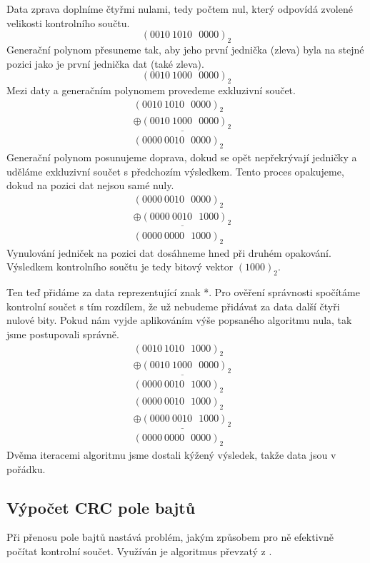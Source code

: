 Data zprava doplníme čtyřmi nulami, tedy počtem nul, který odpovídá zvolené velikosti kontrolního součtu.
$$ (0010~1010~~~0000)_2 $$
Generační polynom přesuneme tak, aby jeho první jednička (zleva) byla na stejné pozici jako je první jednička dat (také zleva).
$$ (0010~1000~~~0000)_2 $$
Mezi daty a generačním polynomem provedeme exkluzivní součet.
\begin{eqnarray}
    (0010~1010~~~0000)_2  & \nonumber\\\underline{\oplus
    (0010~1000~~~0000)_2} & \nonumber\\
    (0000~0010~~~0000)_2  & \nonumber
\end{eqnarray}
Generační polynom posunujeme doprava, dokud se opět nepřekrývají jedničky a uděláme exkluzivní součet s předchozím výsledkem. Tento proces opakujeme, dokud na pozici dat nejsou samé nuly.
\begin{eqnarray}
    (0000~0010~~~0000)_2  & \nonumber\\\underline{\oplus
    (0000~0010~~~1000)_2} & \nonumber\\
    (0000~0000~~~1000)_2  & \nonumber
\end{eqnarray}
Vynulování jedniček na pozici dat dosáhneme hned při druhém opakování. Výsledkem kontrolního součtu je tedy bitový vektor $(1000)_2$.

Ten teď přidáme za data reprezentující znak *. Pro ověření správnosti spočítáme kontrolní součet s tím rozdílem, že už nebudeme přidávat za data další čtyři nulové bity. Pokud nám vyjde aplikováním výše popsaného algoritmu nula, tak jsme postupovali správně.
\begin{eqnarray}
    (0010~1010~~~1000)_2  & \nonumber\\\underline{\oplus
    (0010~1000~~~0000)_2} & \nonumber\\
    (0000~0010~~~1000)_2  & \nonumber
\end{eqnarray}
\begin{eqnarray}
    (0000~0010~~~1000)_2  & \nonumber\\\underline{\oplus
    (0000~0010~~~1000)_2} & \nonumber\\
    (0000~0000~~~0000)_2  & \nonumber
\end{eqnarray}
Dvěma iteracemi algoritmu jsme dostali kýžený výsledek, takže data jsou v pořádku.

\subsection{Výpočet CRC pole bajtů}
Při přenosu pole bajtů nastává problém, jakým způsobem pro ně efektivně počítat kontrolní součet. Využíván je algoritmus převzatý z \cite{crc-wiki}.

